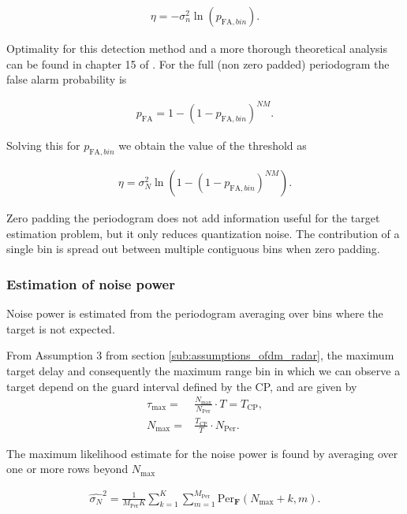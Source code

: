 	\begin{align}
		\eta = -\sigma_n^2 \ln(p_{\text{FA},bin}) .
	\end{align} 
	
	Optimality for this detection method and a more thorough theoretical analysis can be found in chapter 15 of \cite{Richards_Scheer_Holm_2010}.
	For the full (non zero padded) periodogram the false alarm probability is
	
	\begin{align}
		p_\text{FA} = 1 - (1 - p_{\text{FA},bin})^{NM}.
	\end{align}
	
	Solving this for $p_{\text{FA},bin}$ we obtain the value of the threshold as 
	
	\begin{align}
		\eta = \sigma_N^2 \ln{(1 - (1 - p_{\text{FA},bin})^{NM})}.
	\end{align}
	
	Zero padding the periodogram does not add information useful for the target estimation problem, but it only reduces quantization noise. The contribution of a single bin is spread out between multiple contiguous bins when zero padding.

	\subsubsection{Estimation of noise power}
	
		Noise power is estimated from the periodogram averaging over bins where the target is not expected.
		
		From Assumption 3 from section \ref{sub:assumptions_ofdm_radar}, the maximum target delay and consequently the maximum range bin in which we can observe a target depend on the guard interval defined by the CP, and are given by
		\begin{align}
			\tau_{\text{max}} =& \frac{N_{\text{max}}}{N_{\text{Per}}}\cdot T = T_\text{CP} ,\\
			N_{\text{max}} =& \frac{T_\text{CP}}{T}\cdot N_{\text{Per}}.
		\end{align} 
		
		The maximum likelihood estimate for the noise power is found by averaging over one or more rows beyond $N_{\text{max}}$

		\begin{align}
		\label{align: threshold_noise_power}
			\hat{\sigma_N}^2 = \frac{1}{M_{\text{Per}}K} \sum_{k=1}^K \sum_{m=1}^{M_{\text{Per}}} \text{Per}_{\bm{F}}(N_{\text{max}}+k, m).
		\end{align}

